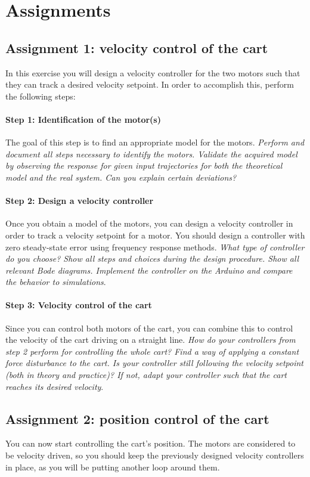 \documentclass[10pt,a4paper]{article}
\begin{document}
\section{Assignments}

\subsection{Assignment 1: velocity control of the cart}
In this exercise you will design a velocity controller for the two motors such that they can track a desired velocity setpoint. In order to accomplish this, perform the following steps:
\paragraph{Step 1: Identification of the motor(s)} The goal of this step is to find an appropriate model for the motors. \textit{Perform and document all steps necessary to identify the motors. Validate the acquired model by observing the response for given input trajectories for both the theoretical model and the real system. Can you explain certain deviations?}
\paragraph{Step 2: Design a velocity controller} Once you obtain a model of the motors, you can design a velocity controller in order to track a velocity setpoint for a motor. You should design a controller with zero steady-state error using frequency response methods. \textit{What type of controller do you choose? Show all steps and choices during the design procedure. Show all relevant Bode diagrams. Implement the controller on the Arduino and compare the behavior to simulations}.
\paragraph{Step 3: Velocity control of the cart} Since you can control both motors of the cart, you can combine this to control the velocity of the cart driving on a straight line. \textit{How do your controllers from step 2 perform for controlling the whole cart? Find a way of applying a constant force disturbance to the cart. Is your controller still following the velocity setpoint (both in theory and practice)? If not, adapt your controller such that the cart reaches its desired velocity}.

\subsection{Assignment 2: position control of the cart}
You can now start controlling the cart's position. The motors are considered to be velocity driven, so you should keep the previously designed velocity controllers in place, as you will be putting another loop around them.
\end{document}
